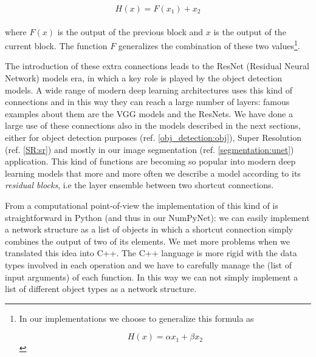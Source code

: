 \documentclass{standalone}
\begin{document}
\begin{equation}
H(x) = F(x_1) + x_2
\end{equation}
\\
where $F(x)$ is the output of the previous block and $x$ is the output of the current block.
The function $F$ generalizes the combination of these two values\footnote{
  In our implementations we choose to generalize this formula as

  \begin{equation}
  H(x) = \alpha x_1 + \beta x_2
  \end{equation}
}.

The introduction of these extra connections leads to the ResNet (Residual Neural Network) models era, in which a key role is played by the object detection models.
A wide range of modern deep learning architectures uses this kind of connections and in this way they can reach a large number of layers: famous examples about them are the VGG models and the ResNets.
We have done a large use of these connections also in the models described in the next sections, either for object detection purposes (ref. \ref{obj_detection:obj}), Super Resolution (ref. \ref{SR:sr}) and mostly in our image segmentation (ref. \ref{segmentation:unet}) application.
This kind of functions are becoming so popular into modern deep learning models that more and more often we describe a model according to its \emph{residual blocks}, i.e the layer ensemble between two shortcut connections.

From a computational point-of-view the implementation of this kind of  is straightforward in \textsf{Python} (and thus in our \textsf{NumPyNet}): we can easily implement a network structure as a list of objects in which a shortcut connection simply combines the output of two of its elements.
We met more problems when we translated this idea into \textsf{C++}.
The \textsf{C++} language is more rigid with the data types involved in each operation and we have to carefully manage the  (list of input arguments) of each function.
In this way we can not simply implement a list of different object types as a network structure.
\end{document}
